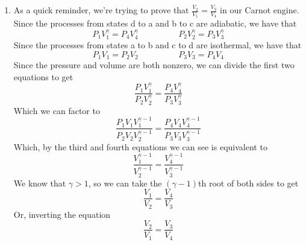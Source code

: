 \begin{enumerate}
    \item As a quick reminder, we're trying to prove that $\frac{V_2}{V_1} = \frac{V_3}{V_4}$ in our Carnot engine. Since the processes from states d to a and b to c are adiabatic, we have that
    \begin{equation*}
        P_1V_1^\gamma = P_4V_4^\gamma \hspace{2cm} P_2V_2^\gamma = P_3V_3^\gamma
    \end{equation*}
    Since the processes from states a to b and c to d are isothermal, we have that
    \begin{equation*}
        P_1V_1 = P_2V_2 \hspace{2cm} P_3V_3 = P_4V_4
    \end{equation*}
    Since the pressure and volume are both nonzero, we can divide the first two equations to get
    \begin{equation*}
        \frac{P_1V_1^\gamma}{P_2V_2^\gamma} = \frac{P_4V_4^\gamma}{P_3V_3^\gamma}
    \end{equation*}
    Which we can factor to
    \begin{equation*}
        \frac{P_1V_1V_1^{\gamma - 1}}{P_2V_2V_2^{\gamma - 1}} = \frac{P_4V_4V_4^{\gamma - 1}}{P_3V_3V_3^{\gamma - 1}}
    \end{equation*}
    Which, by the third and fourth equations we can see is equivalent to
    \begin{equation*}
        \frac{V_1^{\gamma - 1}}{V_2^{\gamma - 1}} = \frac{V_4^{\gamma - 1}}{V_3^{\gamma - 1}}
    \end{equation*}
    We know that $\gamma > 1$, so we can take the $(\gamma - 1)$th root of both sides to get
    \begin{equation*}
        \frac{V_1}{V_2} = \frac{V_4}{V_3}
    \end{equation*}
    Or, inverting the equation
    \begin{equation*}
        \frac{V_2}{V_1} = \frac{V_3}{V_4}
    \end{equation*}
\end{enumerate}